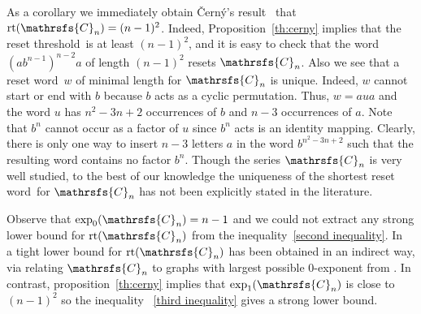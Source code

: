 \documentclass[12pt,twoside]{article}
\newcommand{\sw}{reset word}
\newcommand{\reth}{reset threshold}
\DeclareMathOperator{\rt}{rt}
\begin{document}
As a corollary we immediately obtain \v{C}ern\'{y}'s
result~\cite[Lemma~1]{Ce64} that $\rt(\mathrsfs{C}_n)=(n - 1)^2$. Indeed,
Proposition~\ref{th:cerny} implies that the \reth\ is at least $(n - 1)^2$, and
it is easy to check that the word $(ab^{n - 1})^{n - 2}a$ of length $(n - 1)^2$
resets $\mathrsfs{C}_n$. Also we see that a \sw\ $w$ of minimal length for
$\mathrsfs{C}_n$ is unique. Indeed, $w$ cannot start or end with $b$ because
$b$ acts as a cyclic permutation. Thus, $w = aua$ and the word $u$ has $n^2 -
3n + 2$ occurrences of $b$ and $n - 3$ occurrences of $a$. Note that $b^n$
cannot occur as a factor of $u$ since $b^n$ acts is an identity mapping.
Clearly, there is only one way to insert $n - 3$ letters $a$ in the word
$b^{n^2-3n+2}$ such that the resulting word contains no factor $b^n$. Though
the series $\mathrsfs{C}_n$ is very well studied, to the best of our knowledge
the uniqueness of the shortest \sw\ for $\mathrsfs{C}_n$ has not been
explicitly stated in the literature.

Observe that $\exp_0(\mathrsfs{C}_n)=n-1$ and we could not extract any strong
lower bound for $\rt(\mathrsfs{C}_n)$ from the inequality~\eqref{second
inequality}. In~\cite{AGV} a tight lower bound for $\rt(\mathrsfs{C}_n)$ has
been obtained in an indirect way, via relating $\mathrsfs{C}_n$ to graphs with
largest possible 0-exponent from \cite{Wi50}. In contrast, proposition~\ref{th:cerny}
implies that $\exp_1(\mathrsfs{C}_n)$ is close to $(n-1)^2$ so the inequality
~\eqref{third inequality} gives a strong lower bound.


\end{document}
